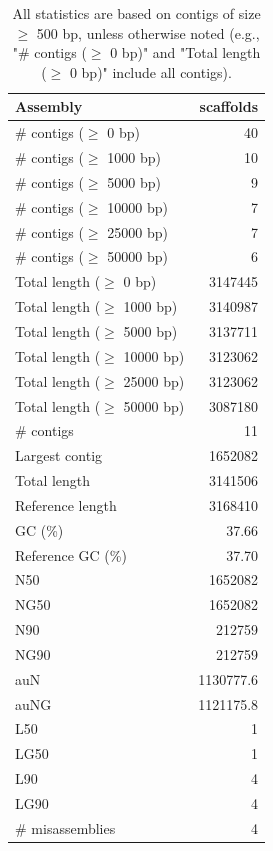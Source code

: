 \documentclass[12pt,a4paper]{article}
\begin{document}
\begin{table}[ht]
\begin{center}
\caption{All statistics are based on contigs of size $\geq$ 500 bp, unless otherwise noted (e.g., "\# contigs ($\geq$ 0 bp)" and "Total length ($\geq$ 0 bp)" include all contigs).}
\begin{tabular}{|l*{1}{|r}|}
\hline
Assembly & scaffolds \\ \hline
\# contigs ($\geq$ 0 bp) & 40 \\ \hline
\# contigs ($\geq$ 1000 bp) & 10 \\ \hline
\# contigs ($\geq$ 5000 bp) & 9 \\ \hline
\# contigs ($\geq$ 10000 bp) & 7 \\ \hline
\# contigs ($\geq$ 25000 bp) & 7 \\ \hline
\# contigs ($\geq$ 50000 bp) & 6 \\ \hline
Total length ($\geq$ 0 bp) & 3147445 \\ \hline
Total length ($\geq$ 1000 bp) & 3140987 \\ \hline
Total length ($\geq$ 5000 bp) & 3137711 \\ \hline
Total length ($\geq$ 10000 bp) & 3123062 \\ \hline
Total length ($\geq$ 25000 bp) & 3123062 \\ \hline
Total length ($\geq$ 50000 bp) & 3087180 \\ \hline
\# contigs & 11 \\ \hline
Largest contig & 1652082 \\ \hline
Total length & 3141506 \\ \hline
Reference length & 3168410 \\ \hline
GC (\%) & 37.66 \\ \hline
Reference GC (\%) & 37.70 \\ \hline
N50 & 1652082 \\ \hline
NG50 & 1652082 \\ \hline
N90 & 212759 \\ \hline
NG90 & 212759 \\ \hline
auN & 1130777.6 \\ \hline
auNG & 1121175.8 \\ \hline
L50 & 1 \\ \hline
LG50 & 1 \\ \hline
L90 & 4 \\ \hline
LG90 & 4 \\ \hline
\# misassemblies & 4 \\ \hline

\end{tabular}
\end{center}
\end{table}
\end{document}
